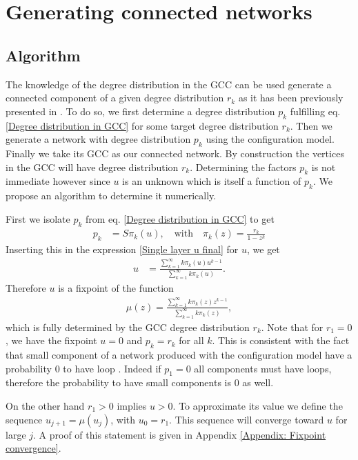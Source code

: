\documentclass[
11pt, %
english, %
singlespacing, %
nolistspacing, %
liststotoc, %
headsepline, %
]{MastersDoctoralThesis} %
\begin{document}
\section{Generating connected networks}
\label{Section: Generating connected networks}

\subsection{Algorithm}

The knowledge of the degree distribution in the GCC can be used generate a connected component of a given degree distribution $r_k$ as it has been previously presented in \cite{bialas2008correlations}. To do so, we first determine a degree distribution $p_k$ fulfilling eq. \eqref{Degree distribution in GCC} for some target degree distribution $r_k$. Then we generate a network with degree distribution $p_k$ using the configuration model. Finally we take its GCC as our connected network. By construction the vertices in the GCC will have degree distribution $r_k$. Determining the factors $p_k$ is not immediate however since $u$ is an unknown which is itself a function of $p_k$. We propose an algorithm to determine it numerically.

First we isolate $p_k$ from eq. \eqref{Degree distribution in GCC} to get
\begin{align}
	p_k &= S \pi_k(u), \quad \text{with} \quad \pi_k(z) = \frac{r_k}{1 - z^k}
\end{align}
Inserting this in the expression \eqref{Single layer u final} for $u$, we get
\begin{align}
	u &= \frac{\sum_{k=1}^\infty k \pi_k(u) u^{k-1}}{\sum_{k=1}^\infty k \pi_k(u)}. \label{Fixpoint equation for u}
\end{align}
Therefore $u$ is a fixpoint of the function
\begin{align}
	\mu(z) = \frac{\sum_{k=1}^\infty k \pi_k(z) z^{k-1}}{\sum_{k=1}^\infty k \pi_k(z)}, \label{Defition of mu}
\end{align}
which is fully determined by the GCC degree distribution $r_k$. Note that for $r_1 = 0$, we have the fixpoint $u = 0$ and $p_k = r_k$ for all $k$. This is consistent with the fact that small component of a network produced with the configuration model have a probability $0$ to have loop \cite{newman2010networks}. Indeed if $p_1 = 0$ all components must have loops, therefore the probability to have small components is $0$ as well.

On the other hand $r_1 > 0$ implies $u > 0$. To approximate its value we define the sequence $u_{j+1} = \mu(u_j)$, with $u_0 = r_1$. This sequence will converge toward $u$ for large $j$. A proof of this statement is given in Appendix \ref{Appendix: Fixpoint convergence}.
\end{document}
